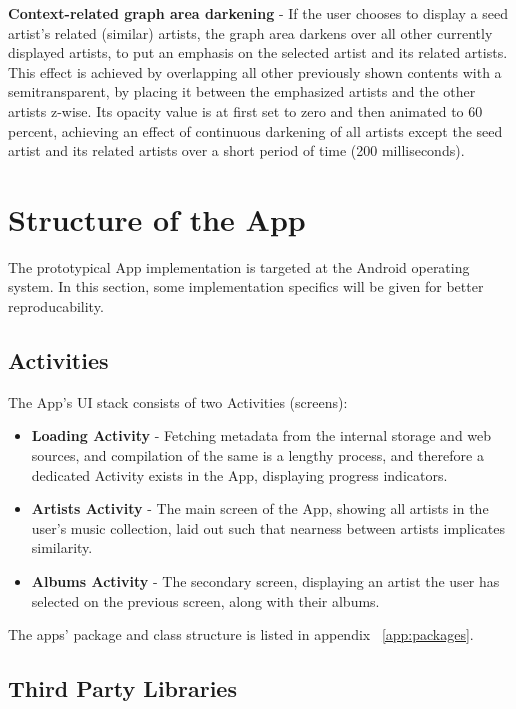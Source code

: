 \textbf{Context-related graph area darkening} - If the user chooses to display a seed artist's related (similar) artists, the graph area darkens over all other currently displayed artists, to put an emphasis on the selected artist and its related artists. This effect is achieved by overlapping all other previously shown contents with a semitransparent, by placing it between the emphasized artists and the other artists z-wise. Its opacity value is at first set to zero and then animated to 60 percent, achieving an effect of continuous darkening of all artists except the seed artist and its related artists over a short period of time (200 milliseconds).

\section{Structure of the App}

The prototypical App implementation is targeted at the Android operating system. In this section, some implementation specifics will be given for better reproducability.

\subsection{Activities}

The App's UI stack consists of two Activities (screens):

\begin{itemize}
	\item \textbf{Loading Activity} - Fetching metadata from the internal storage and web sources, and compilation of the same is a lengthy process, and therefore a dedicated Activity exists in the App, displaying progress indicators.
	\item \textbf{Artists Activity} - The main screen of the App, showing all artists in the user's music collection, laid out such that nearness between artists implicates similarity.
	\item \textbf{Albums Activity} - The secondary screen, displaying an artist the user has selected on the previous screen, along with their albums.
\end{itemize}

The apps' package and class structure is listed in appendix ~\ref{app:packages}.

\subsection{Third Party Libraries}


